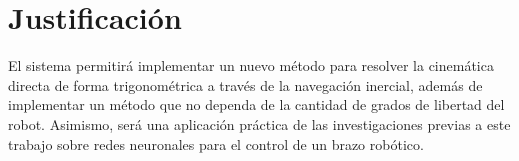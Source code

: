 \section{Justificación}

El sistema permitirá implementar un nuevo método para resolver la cinemática directa de forma trigonométrica a través de la navegación inercial, además de implementar un método que no dependa de la cantidad de grados de libertad del robot. Asimismo, será una aplicación práctica de las investigaciones previas a este trabajo sobre redes neuronales para el control de un brazo robótico.